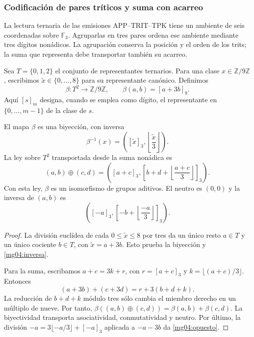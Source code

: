 \subsubsection{Codificación de pares tríticos y suma con acarreo}
\label{mg04:codificacion}

La lectura ternaria de las emisiones APP--TRIT--TPK tiene un ambiente
de seis coordenadas sobre \(\mathbb F_3\). Agruparlas en tres pares
ordena ese ambiente mediante tres dígitos nonádicos. La agrupación
conserva la posición y el orden de los trits; la suma que representa
debe transportar también su acarreo.

Sea \(T=\{0,1,2\}\) el conjunto de representantes ternarios.
Para una clase \(x\in\mathbb Z/9\mathbb Z\), escribimos
\(\widetilde x\in\{0,\ldots,8\}\) para su representante canónico.
Definimos
\begin{equation}
 \beta:T^2\longrightarrow\mathbb Z/9\mathbb Z,
 \qquad \beta(a,b)=[a+3b]_9.
 \label{mg04:beta}
\end{equation}
Aquí \([s]_m\) designa, cuando se emplea como dígito, el representante
en \(\{0,\ldots,m-1\}\) de la clase de \(s\).

\begin{proposition}
El mapa \(\beta\) es una biyección, con inversa
\begin{equation}
 \beta^{-1}(x)=
 \left([\widetilde x]_3,
       \left\lfloor\frac{\widetilde x}{3}\right\rfloor\right).
 \label{mg04:inversa}
\end{equation}
La ley sobre \(T^2\) transportada desde la suma nonádica es
\begin{equation}
 (a,b)\oplus(c,d)=
 \left([a+c]_3,
 \left[b+d+\left\lfloor\frac{a+c}{3}\right\rfloor\right]_3\right).
 \label{mg04:suma}
\end{equation}
Con esta ley, \(\beta\) es un isomorfismo de grupos aditivos.
El neutro es \((0,0)\) y la inversa de \((a,b)\) es
\begin{equation}
 \left([-a]_3,
 \left[-b+\left\lfloor\frac{-a}{3}\right\rfloor\right]_3\right).
 \label{mg04:opuesto}
\end{equation}
\end{proposition}

\begin{proof}
La división euclídea de cada \(0\leq\widetilde x\leq8\) por
tres da un único resto \(a\in T\) y un único cociente \(b\in T\),
con \(\widetilde x=a+3b\). Esto prueba la biyección y
\eqref{mg04:inversa}.

Para la suma, escribamos \(a+c=3k+r\), con
\(r=[a+c]_3\) y \(k=\lfloor(a+c)/3\rfloor\). Entonces
\[
 (a+3b)+(c+3d)=r+3(b+d+k).
\]
La reducción de \(b+d+k\) módulo tres sólo cambia el miembro
derecho en un múltiplo de nueve. Por tanto,
\(\beta((a,b)\oplus(c,d))=\beta(a,b)+\beta(c,d)\).
La biyectividad transporta asociatividad, conmutatividad y neutro.
Por último, la división \(-a=3\lfloor-a/3\rfloor+[-a]_3\)
aplicada a \(-a-3b\) da \eqref{mg04:opuesto}.
\end{proof}

